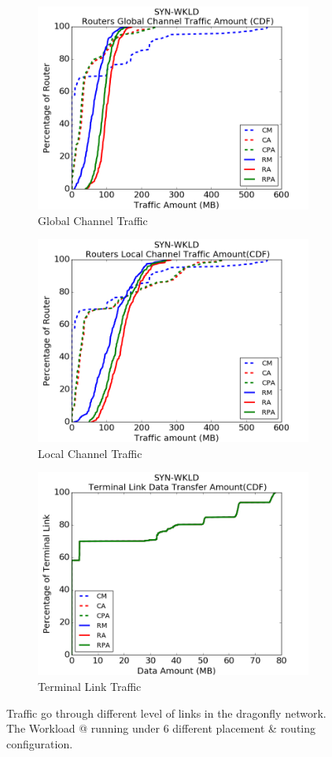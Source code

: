\documentclass[conference,compsoc]{IEEEtran}
\makeatletter
\newcommand{\Rmnum}[1]{\expandafter\@slowromancap\romannumeral #1@}
\makeatother
\begin{document}
\begin{figure}[t!]
    \centering
    \begin{subfigure}[t]{0.32\textwidth}
        \centering
        \includegraphics[height=1.8 in]{syn-wkld/gc-traffic}
        \caption{Global Channel Traffic}
        \label{fig:synwkld-global-channel-traffic}
    \end{subfigure}%
    \hspace{1em}%
    \begin{subfigure}[t]{0.32\textwidth}
        \centering
        \includegraphics[height=1.8 in]{syn-wkld/lc-traffic}
        \caption{Local Channel Traffic}
        \label{fig:synwkld-local-channel-traffic}
    \end{subfigure}%
    \hspace{1em}%
    \begin{subfigure}[t]{0.32\textwidth}
        \centering
        \includegraphics[height=1.8 in]{syn-wkld/tl-traffic}
        \caption{Terminal Link Traffic}
        \label{fig:synwkld-terminal-link-traffic}
    \end{subfigure}%
  \caption{Traffic go through different level of links in the dragonfly network. The Workload \Rmnum{2} running under 6 different placement \& routing configuration.}
   \label{fig:synwkld-network-traffic}
\end{figure}
\end{document}
